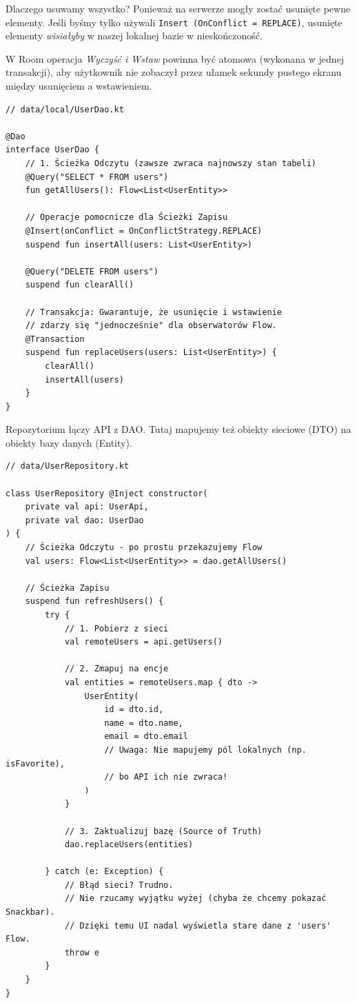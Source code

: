 Dlaczego usuwamy wszystko? Ponieważ na serwerze mogły zostać usunięte pewne elementy. Jeśli byśmy tylko używali \texttt{Insert (OnConflict = REPLACE)}, usunięte elementy \textit{wisiałyby} w naszej lokalnej bazie w nieskończoność.

W Room operacja \textit{Wyczyść i Wstaw} powinna być atomowa (wykonana w jednej transakcji), aby użytkownik nie zobaczył przez ułamek sekundy pustego ekranu między usunięciem a wstawieniem.

\begin{verbatim}
// data/local/UserDao.kt

@Dao
interface UserDao {
    // 1. Ścieżka Odczytu (zawsze zwraca najnowszy stan tabeli)
    @Query("SELECT * FROM users")
    fun getAllUsers(): Flow<List<UserEntity>>

    // Operacje pomocnicze dla Ścieżki Zapisu
    @Insert(onConflict = OnConflictStrategy.REPLACE)
    suspend fun insertAll(users: List<UserEntity>)

    @Query("DELETE FROM users")
    suspend fun clearAll()

    // Transakcja: Gwarantuje, że usunięcie i wstawienie
    // zdarzy się "jednocześnie" dla obserwatorów Flow.
    @Transaction
    suspend fun replaceUsers(users: List<UserEntity>) {
        clearAll()
        insertAll(users)
    }
}
\end{verbatim}

Repozytorium łączy API z DAO. Tutaj mapujemy też obiekty sieciowe (DTO) na obiekty bazy danych (Entity).

\begin{verbatim}
// data/UserRepository.kt

class UserRepository @Inject constructor(
    private val api: UserApi,
    private val dao: UserDao
) {
    // Ścieżka Odczytu - po prostu przekazujemy Flow
    val users: Flow<List<UserEntity>> = dao.getAllUsers()

    // Ścieżka Zapisu
    suspend fun refreshUsers() {
        try {
            // 1. Pobierz z sieci
            val remoteUsers = api.getUsers()
            
            // 2. Zmapuj na encje
            val entities = remoteUsers.map { dto -> 
                UserEntity(
                    id = dto.id,
                    name = dto.name,
                    email = dto.email
                    // Uwaga: Nie mapujemy pól lokalnych (np. isFavorite),
                    // bo API ich nie zwraca!
                ) 
            }
            
            // 3. Zaktualizuj bazę (Source of Truth)
            dao.replaceUsers(entities)
            
        } catch (e: Exception) {
            // Błąd sieci? Trudno.
            // Nie rzucamy wyjątku wyżej (chyba że chcemy pokazać Snackbar).
            // Dzięki temu UI nadal wyświetla stare dane z 'users' Flow.
            throw e 
        }
    }
}
\end{verbatim}

